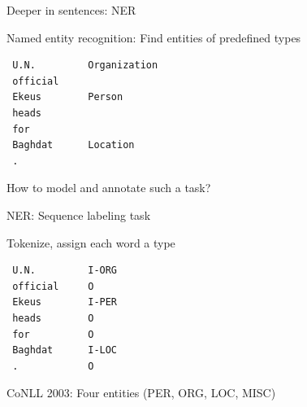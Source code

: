 \documentclass[12pt,aspectratio=169,handout]{beamer}
\begin{document}
\begin{frame}[fragile]{ Deeper in sentences: NER}

Named entity recognition: Find entities of predefined types

\begin{example}
\begin{verbatim}
 U.N.         Organization
 official     
 Ekeus        Person
 heads        
 for          
 Baghdat      Location
 .            
\end{verbatim}
\end{example}

How to model and annotate such a task?


\end{frame}

\begin{frame}[fragile]{NER: Sequence labeling task}

Tokenize, assign each word a type

\begin{example}
\begin{verbatim}
 U.N.         I-ORG
 official     O
 Ekeus        I-PER
 heads        O
 for          O
 Baghdat      I-LOC
 .            O
\end{verbatim}
\end{example}

CoNLL 2003: Four entities (PER, ORG, LOC, MISC)

\end{frame}
\end{document}
